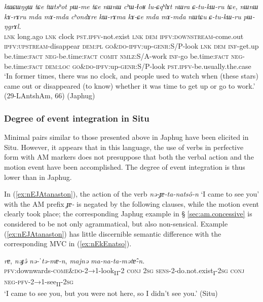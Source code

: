 \documentclass[oneside,a4paper,11pt]{article}
\newcommand{\ipa}[1]{{\phon\textit{#1}}}
\newcommand{\sens}[1]{‘#1’}
\newcommand{\rouge}[1]{{\color{red}#1}}
\begin{document}
 \begin{exe}
\ex \label{ex:kWrAma.kACe}
\gll  \ipa{tɕe}	\ipa{kɯɕɯŋgɯ}	\ipa{tɕe}	\ipa{tɯtsʰot}	\ipa{pɯ-me}	\ipa{tɕe}	\ipa{nɯnɯ}	\ipa{cʰɯ-ɬoʁ}	\ipa{lu-ɕqʰlɤt}	\ipa{nɯra}	\ipa{ɕ-tu-kɯ-ru}	\ipa{tɕe,}	\ipa{nɯnɯ}	\ipa{kɤ-rɤru}	\ipa{mda}	\ipa{mɤ-mda}	\ipa{cʰondɤre}	\ipa{kɯ-rɤma}	\ipa{kɤ-ɕe}	\ipa{mda}	\ipa{mɤ-mda}	\ipa{nɯtɕu}	\ipa{ɕ-tu-kɯ-ru}	\ipa{pɯ-ŋgrɤl.} \\
 \textsc{lnk} long.ago \textsc{lnk} clock \textsc{pst}.\textsc{ipfv}-not.exist \textsc{lnk} \textsc{dem} \textsc{ipfv}:\textsc{downstream}-come.out \textsc{ipfv}:\textsc{upstream}-disappear \textsc{dem}:\textsc{pl} \textsc{go\&do}-\textsc{ipfv}:up-\textsc{genr}:S/P-look \textsc{lnk} \textsc{dem} \textsc{inf}-get.up be.time:\textsc{fact} \textsc{neg}-be.time:\textsc{fact} \textsc{comit} \textsc{nmlz}:S/A-work \textsc{inf}-go be.time:\textsc{fact} \textsc{neg}-be.time:\textsc{fact} \textsc{dem}:\textsc{loc} \textsc{go\&do}-\textsc{ipfv}:up-\textsc{genr}:S/P-look \textsc{pst}.\textsc{ipfv}-be.usually.the.case  \\
 \glt  `In former times, there was no clock, and people used to watch when (these stars) came out or disappeared (to know) whether it was time to get up or go to work.' (29-LAntshAm, 66) (Japhug)
  \end{exe}
  
\subsubsection{Degree of event integration in Situ} \label{sec:am.situ}
Minimal pairs similar to those presented above in Japhug have been elicited in Situ. However, it appears that in this language, the use of verbs in perfective form with AM markers does not presuppose that both the verbal action and the motion event have been accomplished. The degree of event integration is thus lower than in Japhug.


In (\ref{ex:nEJAtanaston}), the action of the verb \ipa{nə-ɟɐ-ta-natsô-n}  `I came to see you' with the AM prefix \ipa{ɟɐ-} is negated by the following clauses, while the motion event clearly took place; the corresponding Japhug example in § \ref{sec:am.concessive} is considered to be not only agrammatical, but also non-sensical. Example (\ref{ex:nEJAtanaston}) has little discernible semantic difference with the corresponding MVC in (\ref{ex:nEkEnatso}).
 

\begin{exe}
\ex \label{ex:nEJAtanaston}
\gll \ipa{nə-\rouge{ɟɐ}-ta-natsô-n} \ipa{rɐ}, \ipa{nəɟə̂} \ipa{nə-ˈtə-mɐ-n}, \ipa{majnə} \ipa{ma-na-ta-mətɐ̂-n}.\\
\textsc{pfv}:downwards-\textsc{\rouge{come\&do}}-2→1-look\textsubscript{II}-2 \textsc{conj} \textsc{2sg} \textsc{sens}-2-do.not.exist\textsubscript{I}-\textsc{2sg} \textsc{conj} \textsc{neg}-\textsc{pfv}-2→1-see\textsubscript{II}-\textsc{2sg}\\
\glt  \sens{I came to see you, but you were not here, so I didn't see you.} (Situ)
\end{exe}
\end{document}
